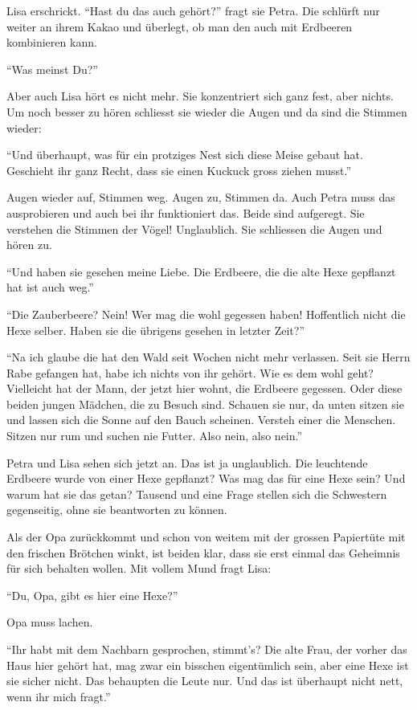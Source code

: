 Lisa erschrickt. \enquote{Hast du das auch gehört?} fragt sie Petra. Die schlürft nur weiter an ihrem Kakao und überlegt, ob man den auch mit Erdbeeren kombinieren kann.

\enquote{Was meinst Du?}

Aber auch Lisa hört es nicht mehr. Sie konzentriert sich ganz fest, aber nichts. Um noch besser zu hören schliesst sie wieder die Augen und da sind die Stimmen wieder:

\enquote{Und überhaupt, was für ein protziges Nest sich diese Meise gebaut hat. Geschieht ihr ganz Recht, dass sie einen Kuckuck gross ziehen musst.}  

Augen wieder auf, Stimmen weg. Augen zu, Stimmen da. Auch Petra muss das ausprobieren und auch bei ihr funktioniert das. Beide sind aufgeregt. Sie verstehen die Stimmen der Vögel! Unglaublich. Sie schliessen die Augen und hören zu.

\enquote{Und haben sie gesehen meine Liebe. Die Erdbeere, die die alte Hexe gepflanzt hat ist auch weg.}

\enquote{Die Zauberbeere? Nein! Wer mag die wohl gegessen haben! Hoffentlich nicht die Hexe selber. Haben sie die übrigens gesehen in letzter Zeit?}

\enquote{Na ich glaube die hat den Wald seit Wochen nicht mehr verlassen. Seit sie Herrn Rabe gefangen hat, habe ich nichts von ihr gehört. Wie es dem wohl geht? Vielleicht hat der Mann, der jetzt hier wohnt, die Erdbeere gegessen. Oder diese beiden jungen Mädchen, die zu Besuch sind. Schauen sie nur, da unten sitzen sie und lassen sich die Sonne auf den Bauch scheinen. Versteh einer die Menschen. Sitzen nur rum und suchen nie Futter. Also nein, also nein.}

Petra und Lisa sehen sich jetzt an. Das ist ja unglaublich. Die leuchtende Erdbeere wurde von einer Hexe gepflanzt? Was mag das für eine Hexe sein? Und warum hat sie das getan? Tausend und eine Frage stellen sich die Schwestern gegenseitig, ohne sie beantworten zu können.

Als der Opa zurückkommt und schon von weitem mit der grossen Papiertüte mit den frischen Brötchen winkt, ist beiden klar, dass sie erst einmal das Geheimnis für sich behalten wollen. Mit vollem Mund fragt Lisa:

\enquote{Du, Opa, gibt es hier eine Hexe?}

Opa muss lachen.

\enquote{Ihr habt mit dem Nachbarn gesprochen, stimmt's? Die alte Frau, der vorher das Haus hier gehört hat, mag zwar ein bisschen eigentümlich sein, aber eine Hexe ist sie sicher nicht. Das behaupten die Leute nur. Und das ist überhaupt nicht nett, wenn ihr mich fragt.}


